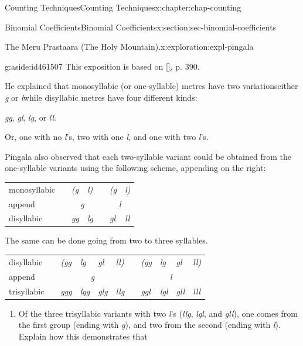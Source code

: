 \documentclass[oneside,10pt,]{book}
\newcommand{\tabularfont}{\relax}
\newcommand{\xreffont}{\relax}
\numberwithin{equation}{section}
\newcommand{\hrulemedium}{\noalign{\hrule height 0.07em}}
\begin{document}
\begin{chapterptx}{Counting Techniques}{}{Counting Techniques}{}{}{x:chapter:chap-counting}
\begin{sectionptx}{Binomial Coefficients}{}{Binomial Coefficients}{}{}{x:section:sec-binomial-coefficients}
\begin{exploration}{The Meru Prastaara (The Holy Mountain).}{x:exploration:expl-pingala}
\begin{aside}{}{g:aside:id461507}
This exposition is based on \hyperlink{x:biblio:bib-kolachana-2019}{[{\xreffont 6}]}, p. 390.%
\end{aside}
He explained that monosyllabic (or one-syllable) metres have two variations\textemdash{}either \emph{g} or \emph{l}\textemdash{}while disyllabic metres have four different kinds:%
\begin{sidebyside}{1}{0.35}{0.35}{0}%
\begin{sbspanel}{0.3}%
\emph{gg}, \emph{gl}, \emph{lg}, or \emph{ll}.%
\end{sbspanel}%
\end{sidebyside}%
\par
Or, one with no \emph{l}'s, two with one \emph{l}, and one with two \emph{l}'s.%
\par
Piṅgala also observed that each two-syllable variant could be obtained from the one-syllable variants using the following scheme, appending on the right:%
\begin{sidebyside}{1}{0.15}{0.15}{0}%
\begin{sbspanel}{0.7}%
{\centering%
{\tabularfont%
\begin{tabular}{lllllll}
monosyllabic&&\emph{(g}&\emph{l)}&&\emph{(g}&\emph{l)}\tabularnewline[0pt]
append&&\multicolumn{2}{c}{\emph{g}}&&\multicolumn{2}{c}{\emph{l}}\tabularnewline\hrulemedium
disyllabic&&\emph{gg}&\emph{lg}&&\emph{gl}&\emph{ll}
\end{tabular}
}%
\par}
\end{sbspanel}%
\end{sidebyside}%
\par
The same can be done going from two to three syllables.%
\begin{sidebyside}{1}{0.15}{0.15}{0}%
\begin{sbspanel}{0.7}%
{\centering%
{\tabularfont%
\begin{tabular}{lllllllllll}
disyllabic&&\emph{(gg}&\emph{lg}&\emph{gl}&\emph{ll)}&&\emph{(gg}&\emph{lg}&\emph{gl}&\emph{ll)}\tabularnewline[0pt]
append&&\multicolumn{4}{c}{\emph{g}}&&\multicolumn{4}{c}{\emph{l}}\tabularnewline\hrulemedium
trisyllabic&&\emph{ggg}&\emph{lgg}&\emph{glg}&\emph{llg}&&\emph{ggl}&\emph{lgl}&\emph{gll}&\emph{lll}
\end{tabular}
}%
\par}
\end{sbspanel}%
\end{sidebyside}%
\begin{enumerate}[font=\bfseries,label=(\alph*),ref=\alph*]
\item{}Of the three trisyllabic variants with two \emph{l}'s (\emph{llg}, \emph{lgl}, and \emph{gll}), one comes from the first group (ending with \emph{g}), and two from the second (ending with \emph{l}). Explain how this demonstrates that%

\end{enumerate}
\end{exploration}
\end{sectionptx}
\end{chapterptx}
\end{document}

